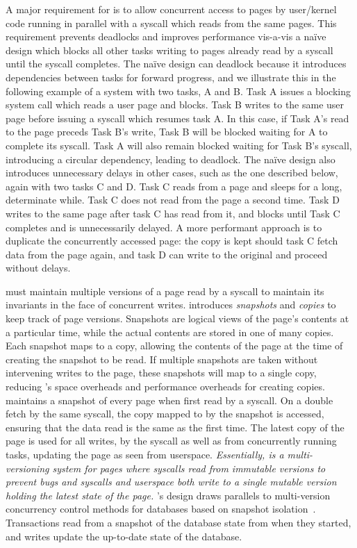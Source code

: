 \documentclass[letterpaper,twocolumn,10pt, anonymous]{article}
\begin{document}
A major requirement for \tiktok is to allow concurrent access to pages
by user/kernel code running in parallel with a syscall which reads from 
the same pages.
This requirement prevents deadlocks and improves performance vis-a-vis
a na\"ive design which blocks all other tasks writing to pages already 
read by a syscall until the syscall completes.
The na\"ive design can deadlock because it introduces dependencies between
tasks for forward progress, and we illustrate this in the following example
of a system with two tasks, A and B.
Task A issues a blocking system call which reads a user page and blocks. 
Task B writes to the same user page before issuing a syscall which 
resumes task A. 
In this case, if Task A's read to the page preceds Task B's write, 
Task B will be blocked waiting for A to complete its syscall.
Task A will also remain blocked waiting for Task B's syscall, 
introducing a circular dependency, leading to deadlock.
The na\"ive design also introduces unnecessary delays in other cases, 
such as the one described below, again with two tasks C and D.
Task C reads from a page and sleeps for a long, determinate while.
Task C does not read from the page a second time.
Task D writes to the same page after task C has read from it, and 
blocks until Task C completes and is unnecessarily delayed.
A more performant approach is to duplicate the concurrently accessed page: the copy is 
kept should task C fetch data from the page again, and task D
can write to the original and proceed without delays.

\tiktok must maintain multiple versions of a page read by a syscall 
to maintain its invariants in the face of concurrent writes.
\tiktok introduces \emph{snapshots} and \emph{copies} to keep track 
of page versions. 
Snapshots are logical views of the page's contents at a particular time,
while the actual contents are stored in one of many copies. 
Each snapshot maps to a copy, allowing the contents of the page at the 
time of creating the snapshot to be read. 
If multiple snapshots are taken without intervening writes to the page, 
these snapshots will map to a single copy, reducing \tiktok's space overheads 
and performance overheads for creating copies.
\tiktok maintains a snapshot of every page when first read by a syscall.
On a double fetch by the same syscall, the copy mapped to by the snapshot 
is accessed, ensuring that the data read is the same as the first time.
The latest copy of the page is used for all writes, by the syscall as 
well as from concurrently running tasks, updating the page as seen 
from userspace.
\emph{Essentially, \tiktok is a multi-versioning system for pages where 
syscalls read from immutable versions to prevent \tocttou bugs and
syscalls and userspace both write to a single mutable version 
holding the latest state of the page.}
\tiktok's design draws parallels to multi-version concurrency control 
methods for databases based on snapshot isolation~\cite{0001MK15}.
Transactions read from a snapshot of the database state from when 
they started, and writes update the up-to-date state of the database.
\end{document}
